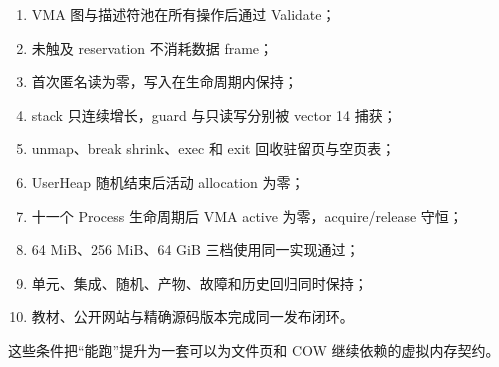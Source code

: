 \begin{enumerate}
  \item VMA 图与描述符池在所有操作后通过 Validate；
  \item 未触及 reservation 不消耗数据 frame；
  \item 首次匿名读为零，写入在生命周期内保持；
  \item stack 只连续增长，guard 与只读写分别被 vector 14 捕获；
  \item unmap、break shrink、exec 和 exit 回收驻留页与空页表；
  \item UserHeap 随机结束后活动 allocation 为零；
  \item 十一个 Process 生命周期后 VMA active 为零，acquire/release 守恒；
  \item 64 MiB、256 MiB、64 GiB 三档使用同一实现通过；
  \item 单元、集成、随机、产物、故障和历史回归同时保持；
  \item 教材、公开网站与精确源码版本完成同一发布闭环。
\end{enumerate}

这些条件把“能跑”提升为一套可以为文件页和 COW 继续依赖的虚拟内存契约。
